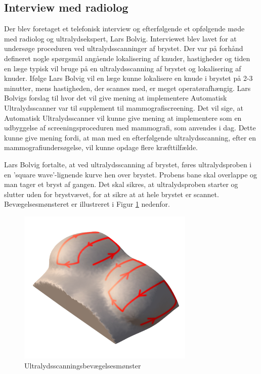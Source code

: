 \subsection{Interview med radiolog}
Der blev foretaget et telefonisk interview og efterfølgende et opfølgende møde med radiolog og ultralydsekspert, Lars Bolvig. Interviewet blev lavet for at undersøge proceduren ved ultralydsscanninger af brystet. Der var på forhånd defineret nogle spørgsmål angående lokalisering af knuder, hastigheder og tiden en læge typisk vil bruge på en ultralydsscanning af brystet og lokalisering af knuder. Ifølge Lars Bolvig vil en læge kunne lokalisere en knude i brystet på 2-3 minutter, mens hastigheden, der scannes med, er meget operatørafhængig. Lars Bolvigs forslag til hvor det vil give mening at implementere Automatisk Ultralydsscanner var til supplement til mammografiscreening. Det vil sige, at Automatisk Ultralydsscanner vil kunne give mening at implementere som en udbyggelse af screeningsproceduren med mammografi, som anvendes i dag. Dette kunne give mening fordi, at man med en efterfølgende ultralydsscanning, efter en mammografiundersøgelse, vil kunne opdage flere kræfttilfælde. 

Lars Bolvig fortalte, at ved ultralydsscanning af brystet, føres ultralydsproben i en 'square wave'-lignende kurve hen over brystet. Probens bane skal overlappe og man tager et bryst af gangen. Det skal sikres, at ultralydsproben starter og slutter uden for brystvævet, for at sikre at at hele brystet er scannet. Bevægelsesmønsteret er illustreret i Figur \ref{Probensbevagelse} nedenfor. 

\begin{figure}[H]
    \centering
    \includegraphics[width=0.75\textwidth]{figurer/d/probebevagelse}
    \caption{Ultralydsscanningsbevægelsesmønster}
    \label{Probensbevagelse}
\end{figure}

